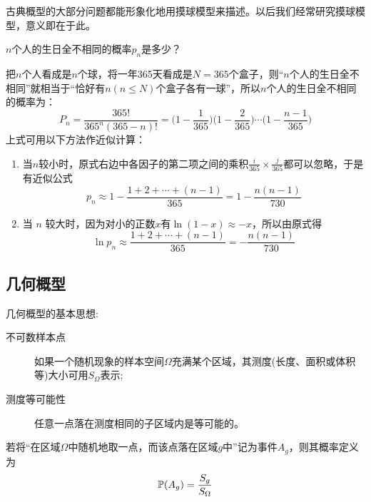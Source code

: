 \begin{note}
    古典概型的大部分问题都能形象化地用摸球模型来描述。以后我们经常研究摸球模型，意义即在于此。
\end{note}

\begin{example}[生日问题]
    $n$个人的生日全不相同的概率$p_n$是多少？
\end{example}
\begin{solution}
    把$n$个人看成是$n$个球，将一年365天看成是$N=365$个盒子，则“$n$个人的生日全不相同”就相当于“恰好有$n (n \le N)$个盒子各有一球”，所以$n$个人的生日全不相同的概率为：
    \[ P_n = \frac{365!}{365^n (365 - n)!} = \biggl(1 - \frac{1}{365}\biggr) \biggl(1 - \frac{2}{365}\biggr) \dotsb \biggl(1 - \frac{n - 1}{365}\biggr) \]
    上式可用以下方法作近似计算：
    \begin{enumerate}
        \item 当$n$较小时，原式右边中各因子的第二项之间的乘积$\frac{i}{365} \times \frac{j}{365}$都可以忽略，于是有近似公式
              \[ p_n \approx 1 - \frac{1 + 2 + \dotsb + (n - 1)}{365}  = 1 - \frac{n (n - 1)}{730}\]
        \item 当 $n$ 较大时，因为对小的正数$x$有$\ln (1-x) \approx -x$，所以由原式得
              \[ \ln p_n \approx \frac{1 + 2 + \dotsb + (n - 1)}{365} = -\frac{n (n - 1)}{730}\]
    \end{enumerate}
\end{solution}

\subsection{几何概型}

几何概型的基本思想:
\begin{description}
    \item[不可数样本点] 如果一个随机现象的样本空间$\Omega$充满某个区域，其测度(长度、面积或体积等)大小可用$S_\Omega$表示;
    \item[测度等可能性] 任意一点落在测度相同的子区域内是等可能的。
\end{description}

\begin{definition}[几何概型]
    若将“在区域$\Omega$中随机地取一点，而该点落在区域$g$中”记为事件$A_g$，则其概率定义为
    \[ \P(A_g) = \frac{S_g}{S_\Omega}\]
\end{definition}

